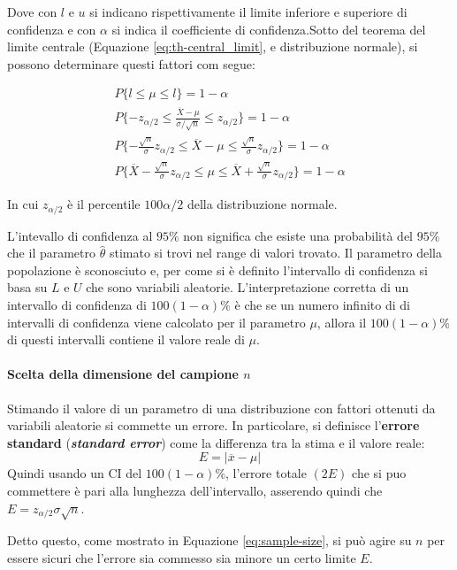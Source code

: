 \documentclass{article}
\begin{document}
Dove con $l$ e $u$ si indicano rispettivamente il limite inferiore e superiore di confidenza
e con $\alpha$ si indica il coefficiente di confidenza.Sotto del teorema del limite
centrale (Equazione \ref{eq:th-central_limit}, e distribuzione normale),
si possono determinare questi fattori com segue:

\begin{align*}
  P\{l\leq \mu \leq l\} = 1 - \alpha  \\
  P\{-z_{\alpha/2} \leq \displaystyle\frac{\overline{X} -\mu}{\sigma/\sqrt{n}} 
  \leq z_{\alpha/2} \} = 1 - \alpha  \\
  P\{-\frac{\sqrt{n}}{\sigma}z_{\alpha/2} \leq \overline{X} -\mu \leq \frac{\sqrt{n}}
  {\sigma} z_{\alpha/2}\} = 1 - \alpha \\
  P\{\overline{X} -\frac{\sqrt{n}}{\sigma}z_{\alpha/2} \leq \mu \leq \overline{X} +\frac{\sqrt{n}}
  {\sigma} z_{\alpha/2}\} = 1 - \alpha
\end{align*}

In cui $z_{\alpha/2}$ è il percentile $100\alpha/2$ della distribuzione normale.

L'intevallo di confidenza al $95\%$ non significa che esiste una probabilità del $95\%$ che 
il parametro $\hat{\theta}$ stimato si trovi nel range di valori trovato. Il parametro 
della popolazione è sconosciuto e, per come si è definito l'intervallo di confidenza 
si basa su $L$ e $U$ che sono variabili aleatorie. L'interpretazione corretta di un intervallo
di confidenza di $100(1-\alpha)\%$ è che se un numero infinito di di intervalli di confidenza
viene calcolato per il parametro $\mu$, allora il $100(1-\alpha)\%$ di questi intervalli 
contiene il valore reale di $\mu$.

\paragraph{Scelta della dimensione del campione $n$}
Stimando il valore di un parametro di una distribuzione con fattori ottenuti da variabili
aleatorie si commette un errore. In particolare, si definisce l'\textbf{errore standard}
(\textbf{\textit{standard error}}) come la differenza tra la stima e il valore reale: 
$$ E = |\overline{x} - \mu | $$
Quindi usando un CI del $100(1-\alpha)\%$, l'errore totale $(2E)$ che si puo commettere è pari alla
lunghezza dell'intervallo, asserendo quindi che $E = z_{\alpha/2}\sigma\sqrt{n}$.

Detto questo, come mostrato in Equazione \ref{eq:sample-size}, 
si può agire su $n$ per essere sicuri che l'errore sia commesso sia minore un certo limite 
$E$.
\end{document}
